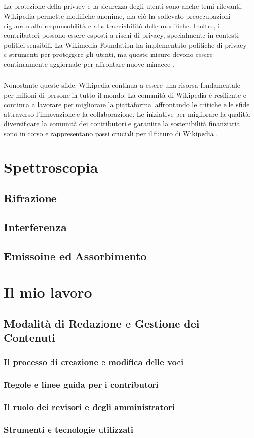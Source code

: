 \documentclass[12pt,a4paper]{report}
\begin{document}
\paragraph*{}
La protezione della privacy e la sicurezza degli utenti sono anche temi rilevanti. Wikipedia permette modifiche anonime, ma ciò ha sollevato preoccupazioni riguardo alla responsabilità e alla tracciabilità delle modifiche. Inoltre, i contributori possono essere esposti a rischi di privacy, specialmente in contesti politici sensibili. La Wikimedia Foundation ha implementato politiche di privacy e strumenti per proteggere gli utenti, ma queste misure devono essere continuamente aggiornate per affrontare nuove minacce \cite{denning2005wikipedia}.

\paragraph*{}
Nonostante queste sfide, Wikipedia continua a essere una risorsa fondamentale per milioni di persone in tutto il mondo. La comunità di Wikipedia è resiliente e continua a lavorare per migliorare la piattaforma, affrontando le critiche e le sfide attraverso l'innovazione e la collaborazione. Le iniziative per migliorare la qualità, diversificare la comunità dei contributori e garantire la sostenibilità finanziaria sono in corso e rappresentano passi cruciali per il futuro di Wikipedia \cite{reagle2010good}.

\chapter{Spettroscopia}
\section{Rifrazione}
\section{Interferenza}
\section{Emissoine ed Assorbimento}
\chapter{Il mio lavoro}
\section{Modalità di Redazione e Gestione dei Contenuti}
\subsection{Il processo di creazione e modifica delle voci}
\subsection{Regole e linee guida per i contributori}
\subsection{Il ruolo dei revisori e degli amministratori}
\subsection{Strumenti e tecnologie utilizzati}

\newpage

\printbibliography
\end{document}
